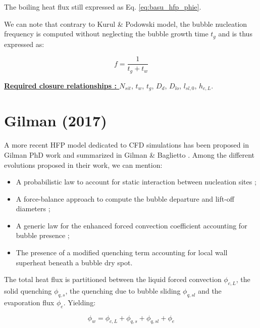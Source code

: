 The boiling heat flux still expressed as Eq. \ref{eq:basu_hfp_phie}.

\npar

\begin{remark*}{}
We can note that contrary to  Kurul \& Podowski model, the bubble nucleation frequency is computed without neglecting the bubble growth time $t_{g}$ and is thus expressed as:

\begin{equation}
f = \dfrac{1}{t_{g} + t_{w}}
\end{equation}
\end{remark*}

\textbf{\underline{Required closure relationships : }} $N_{sit}$, $t_{w}$, $t_{g}$, $D_{d}$, $D_{lo}$, $l_{sl,0}$, $h_{c,L}$. 



\section{Gilman (2017)}

A more recent HFP model dedicated to CFD simulations has been proposed in Gilman PhD work \cite{gilman_development_2014} and summarized in Gilman \& Baglietto \cite{gilman_self-consistent_2017}. Among the different evolutions proposed in their work, we can mention:

\begin{itemize}
\item A probabilistic law to account for static interaction between nucleation sites ;
\item A force-balance approach to compute the bubble departure and lift-off diameters ;
\item A generic law for the enhanced forced convection coefficient accounting for bubble presence ; 
\item The presence of a modified quenching term accounting for local wall superheat beneath a bubble dry spot.
\end{itemize}

The total heat flux is partitioned between the liquid forced convection $\phi_{c,L}$, the solid quenching $\phi_{q,s}$, the quenching due to bubble sliding $\phi_{q,sl}$ and the evaporation flux $\phi_{e}$. Yielding:

\begin{equation}
\phi_{w} = \phi_{c,L} + \phi_{q,s} + \phi_{q,sl} + \phi_{e}
\label{eq:gilman_hfp_phiw}
\end{equation} 

